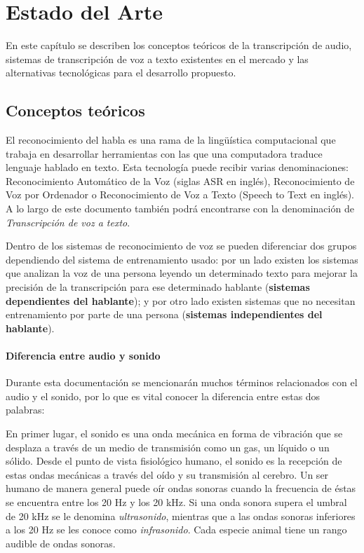 \documentclass[../main.tex]{subfiles}
\begin{document}
\chapter{Estado del Arte}\label{ch:estado_arte}
En este capítulo se describen los conceptos teóricos de la transcripción de audio, sistemas de transcripción de voz a texto existentes en el mercado y las alternativas tecnológicas para el desarrollo propuesto.
\section{Conceptos teóricos}


El reconocimiento del habla es una rama de la lingüística computacional que trabaja en desarrollar herramientas con las que una computadora traduce lenguaje hablado en texto. Esta tecnología puede recibir varias denominaciones: Reconocimiento Automático de la Voz (siglas ASR en inglés), Reconocimiento de Voz por Ordenador o Reconocimiento de Voz a Texto (Speech to Text en inglés). A lo largo de este documento también podrá encontrarse con la denominación de \textit{Transcripción de voz a texto}.

Dentro de los sistemas de reconocimiento de voz se pueden diferenciar dos grupos dependiendo del sistema de entrenamiento usado: por un lado existen los sistemas que analizan la voz de una persona leyendo un determinado texto para mejorar la precisión de la transcripción para ese determinado hablante (\textbf{sistemas dependientes del hablante}); y por otro lado existen sistemas que no necesitan entrenamiento por parte de una persona (\textbf{sistemas independientes del hablante}).

\subsubsection{Diferencia entre audio y sonido}

Durante esta documentación se mencionarán muchos términos relacionados con el audio y el sonido, por lo que es vital conocer la diferencia entre estas dos palabras:

En primer lugar, el sonido es una onda mecánica en forma de vibración que se desplaza a través de un medio de transmisión como un gas, un líquido o un sólido. Desde el punto de vista fisiológico humano, el sonido es la recepción de estas ondas mecánicas a través del oído y su transmisión al cerebro. Un ser humano de manera general puede oír ondas sonoras cuando la frecuencia de éstas se encuentra entre los 20 Hz y los 20 kHz. Si una onda sonora supera el umbral de 20 kHz se le denomina \textit{ultrasonido}, mientras que a las ondas sonoras inferiores a los 20 Hz se les conoce como \textit{infrasonido}. Cada especie animal tiene un rango audible de ondas sonoras.
\end{document}

